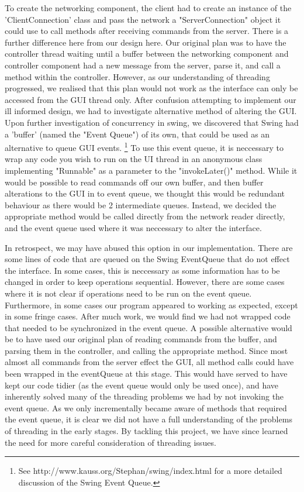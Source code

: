 To create the networking component, the client had to create an instance of the 'ClientConnection' class and pass the network a "ServerConnection" object it could use to call methods after receiving commands from the server. There is a further difference here from our design here. Our original plan was to have the controller thread waiting until a buffer between the networking component and controller component had a new message from the server, parse it, and call a method within the controller. However, as our understanding of threading progressed, we realised that this plan would not work as the interface can only be accessed from the GUI thread only. After confusion attempting to implement our ill informed design, we had to investigate alternative method of altering the GUI. Upon further investigation of concurrency in swing, we discovered that Swing had a 'buffer' (named the "Event Queue") of its own, that could be used as an alternative to queue GUI events. \footnote{See http://www.kauss.org/Stephan/swing/index.html for a more detailed discussion of the Swing Event Queue.} To use this event queue, it is neccessary to wrap any code you wish to run on the UI thread in an anonymous class implementing "Runnable" as a parameter to the "invokeLater()" method.  While it would be possible to read commands off our own buffer, and then buffer alterations to the GUI in to event queue, we thought this would be redundant behaviour as there would be 2 intermediate queues. Instead, we decided the appropriate method would be called directly from the network reader directly, and the event queue used where it was neccessary to alter the interface.

 In retrospect, we may have abused this option in our implementation. There are some lines of code that are queued on the Swing EventQueue that do not effect the interface. In some cases, this is neccessary as some information has to be changed in order to keep operations sequential. However, there are some cases where it is not clear if operations need to be run on the event queue. Furthermore, in some cases our program appeared to working as expected, except in some fringe cases. After much work, we would find we had not wrapped code that needed to be synchronized in the event queue. A possible alternative would be to have used our original plan of reading commands from the buffer, and parsing them in the controller, and calling the appropriate method. Since most almost all commands from the server effect the GUI, all method calls could have been wrapped in the eventQueue at this stage. This would have served to have kept our code tidier (as the event queue would only be used once), and have inherently solved many of the threading problems we had by not invoking the event queue. As we only incrementally became aware of methods that required the event queue, it is clear we did not have a full understanding of the problems of threading in the early stages. By tackling this project, we have since learned the need for more careful consideration of threading issues.


